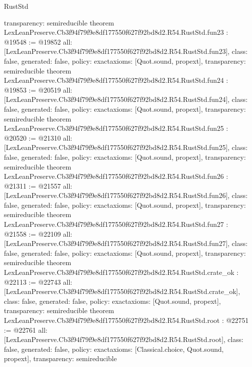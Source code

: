 \begin{lexlean}{RustStd}
\begin{coremodule}
{  transparency: semireducible
}
theorem LexLeanPreserve.Cb3f94f79f9e8df177550f627f92bd8d2.R54.RustStd.fun23 : @19548 := @19852 {
  all: [LexLeanPreserve.Cb3f94f79f9e8df177550f627f92bd8d2.R54.RustStd.fun23],
  class: false,
  generated: false,
  policy: exact{axioms: [Quot.sound, propext]},
  transparency: semireducible
}
theorem LexLeanPreserve.Cb3f94f79f9e8df177550f627f92bd8d2.R54.RustStd.fun24 : @19853 := @20519 {
  all: [LexLeanPreserve.Cb3f94f79f9e8df177550f627f92bd8d2.R54.RustStd.fun24],
  class: false,
  generated: false,
  policy: exact{axioms: [Quot.sound, propext]},
  transparency: semireducible
}
theorem LexLeanPreserve.Cb3f94f79f9e8df177550f627f92bd8d2.R54.RustStd.fun25 : @20520 := @21310 {
  all: [LexLeanPreserve.Cb3f94f79f9e8df177550f627f92bd8d2.R54.RustStd.fun25],
  class: false,
  generated: false,
  policy: exact{axioms: [Quot.sound, propext]},
  transparency: semireducible
}
theorem LexLeanPreserve.Cb3f94f79f9e8df177550f627f92bd8d2.R54.RustStd.fun26 : @21311 := @21557 {
  all: [LexLeanPreserve.Cb3f94f79f9e8df177550f627f92bd8d2.R54.RustStd.fun26],
  class: false,
  generated: false,
  policy: exact{axioms: [Quot.sound, propext]},
  transparency: semireducible
}
theorem LexLeanPreserve.Cb3f94f79f9e8df177550f627f92bd8d2.R54.RustStd.fun27 : @21558 := @22109 {
  all: [LexLeanPreserve.Cb3f94f79f9e8df177550f627f92bd8d2.R54.RustStd.fun27],
  class: false,
  generated: false,
  policy: exact{axioms: [Quot.sound, propext]},
  transparency: semireducible
}
theorem LexLeanPreserve.Cb3f94f79f9e8df177550f627f92bd8d2.R54.RustStd.crate_ok : @22113 := @22743 {
  all: [LexLeanPreserve.Cb3f94f79f9e8df177550f627f92bd8d2.R54.RustStd.crate_ok],
  class: false,
  generated: false,
  policy: exact{axioms: [Quot.sound, propext]},
  transparency: semireducible
}
theorem LexLeanPreserve.Cb3f94f79f9e8df177550f627f92bd8d2.R54.RustStd.root : @22751 := @22761 {
  all: [LexLeanPreserve.Cb3f94f79f9e8df177550f627f92bd8d2.R54.RustStd.root],
  class: false,
  generated: false,
  policy: exact{axioms: [Classical.choice, Quot.sound, propext]},
  transparency: semireducible
}


\end{coremodule}
\end{lexlean}
